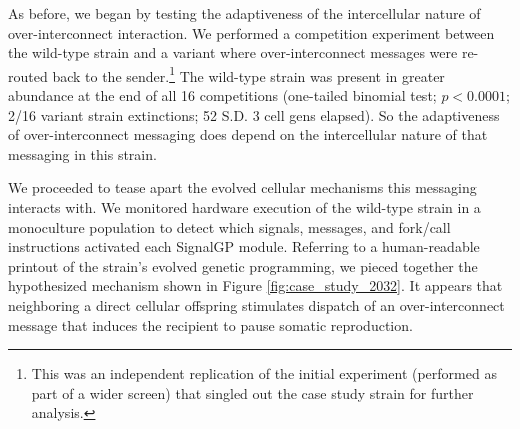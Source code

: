 
As before, we began by testing the adaptiveness of the intercellular nature of over-interconnect interaction. %
We performed a competition experiment between the wild-type strain and a variant where over-interconnect messages were re-routed back to the sender.\footnote{
This was an independent replication of the initial experiment (performed as part of a wider screen) that singled out the case study strain for further analysis.
}
The wild-type strain was present in greater abundance at the end of all 16 competitions (one-tailed binomial test; $p < 0.0001$; 2/16 variant strain extinctions; 52 S.D. 3 cell gens elapsed).
So the adaptiveness of over-interconnect messaging does depend on the intercellular nature of that messaging in this strain.

We proceeded to tease apart the evolved cellular mechanisms this messaging interacts with.
We monitored hardware execution of the wild-type strain in a monoculture population to detect which signals, messages, and fork/call instructions activated each SignalGP module. %
Referring to a human-readable printout of the strain's evolved genetic programming, we pieced together the hypothesized mechanism shown in Figure \ref{fig:case_study_2032}.
It appears that neighboring a direct cellular offspring stimulates dispatch of an over-interconnect message that induces the recipient to pause somatic reproduction.

